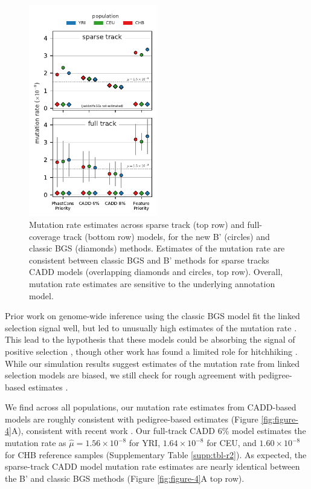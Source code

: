 \documentclass[11pt]{article}
\begin{document}
\begin{figure}[htbp] 
    \centering
    \includegraphics[width=0.5\textwidth]{figures/figure_5.pdf} 
    
    \caption{Mutation rate estimates across sparse track (top row) and
        full-coverage track (bottom row) models, for the new B' (circles) and
        classic BGS (diamonds) methods. Estimates of the mutation rate are
        consistent between classic BGS and B' methods for sparse tracks CADD
        models (overlapping diamonds and circles, top row). Overall, mutation
        rate estimates are sensitive to the underlying annotation model.}
  \label{fig:figure-5}
\end{figure}

Prior work on genome-wide inference using the classic BGS model fit the linked
selection signal well, but led to unusually high estimates of the mutation rate
\parencite{McVicker2009-ax}. This lead to the hypothesis that these models
could be absorbing the signal of positive selection \parencite{Enard2014-kz},
though other work has found a limited role for hitchhiking
\parencite{Pickrell2009-tt,Hernandez2011-gs,Murphy2022-sj}. While our simulation
results suggest estimates of the mutation rate from linked selection models are
biased, we still check for rough agreement with pedigree-based estimates
\parencite{Kong2013-fc,Tian2019-so}. 

We find across all populations, our mutation rate estimates from CADD-based
models are roughly consistent with pedigree-based estimates (Figure
\ref{fig:figure-4}A), consistent with recent work \parencite{Murphy2022-sj}.
Our full-track CADD 6\% model estimates the mutation rate as $\widehat{\mu} =
1.56 \times 10^{-8}$ for YRI, $1.64 \times 10^{-8}$ for CEU, and $1.60 \times
10^{-8}$ for CHB reference samples (Supplementary Table \ref{supp:tbl-r2}). As
expected, the sparse-track CADD model mutation rate estimates are nearly
identical between the B' and classic BGS methods (Figure \ref{fig:figure-4}A
top row).
\end{document}
